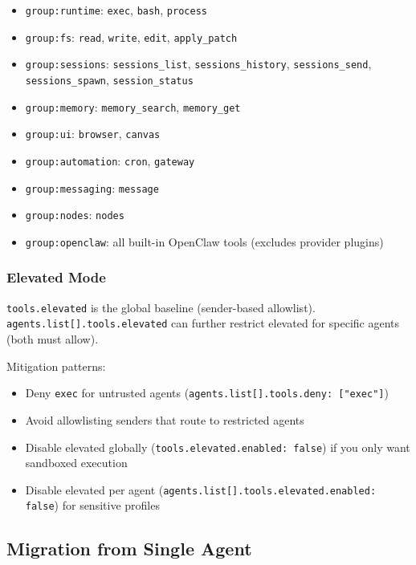 \begin{itemize}
  \item \texttt{group:runtime}: \texttt{exec}, \texttt{bash}, \texttt{process}
  \item \texttt{group:fs}: \texttt{read}, \texttt{write}, \texttt{edit}, \texttt{apply\_patch}
  \item \texttt{group:sessions}: \texttt{sessions\_list}, \texttt{sessions\_history}, \texttt{sessions\_send}, \texttt{sessions\_spawn}, \texttt{session\_status}
  \item \texttt{group:memory}: \texttt{memory\_search}, \texttt{memory\_get}
  \item \texttt{group:ui}: \texttt{browser}, \texttt{canvas}
  \item \texttt{group:automation}: \texttt{cron}, \texttt{gateway}
  \item \texttt{group:messaging}: \texttt{message}
  \item \texttt{group:nodes}: \texttt{nodes}
  \item \texttt{group:openclaw}: all built-in OpenClaw tools (excludes provider plugins)
\end{itemize}


\subsubsection{Elevated Mode}


\texttt{tools.elevated} is the global baseline (sender-based allowlist). \texttt{agents.list[].tools.elevated} can further restrict elevated for specific agents (both must allow).

Mitigation patterns:

\begin{itemize}
  \item Deny \texttt{exec} for untrusted agents (\texttt{agents.list[].tools.deny: ["exec"]})
  \item Avoid allowlisting senders that route to restricted agents
  \item Disable elevated globally (\texttt{tools.elevated.enabled: false}) if you only want sandboxed execution
  \item Disable elevated per agent (\texttt{agents.list[].tools.elevated.enabled: false}) for sensitive profiles
\end{itemize}


\hrulefill


\subsection{Migration from Single Agent}


